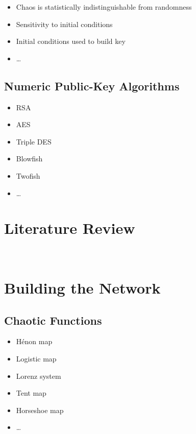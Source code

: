 \documentclass[conference]{IEEEtran}
\begin{document}
\begin{itemize}
    \item Chaos is statistically indistinguishable from randomness~\cite{Alligood}
    \item Sensitivity to initial conditions
    \item Initial conditions used to build key
    \item \ldots
\end{itemize}

\subsection{Numeric Public-Key Algorithms}\label{subsec:numeric-public-key-algorithms}

\begin{itemize}
    \item RSA
    \item AES
    \item Triple DES
    \item Blowfish
    \item Twofish
    \item \ldots
\end{itemize}

\section{Literature Review}\label{sec:literature-review}~\cite{Lokesh,Hamdy,Gujral}



\section{Building the Network}\label{sec:building-the-network}

\subsection{Chaotic Functions}\label{subsec:chaotic-functions}

\begin{itemize}
    \item Hénon map
    \item Logistic map
    \item Lorenz system
    \item Tent map
    \item Horseshoe map
    \item \ldots
\end{itemize}
\end{document}

